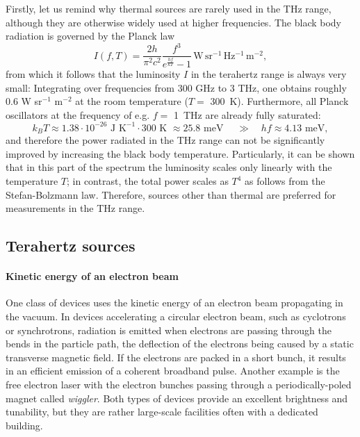 Firstly, let us remind why thermal sources are rarely used in the THz range, although they are otherwise widely used at higher frequencies. The black body radiation is governed by the Planck law \cite[p. 23]{klingshirn2007semiconductor}
\begin{equation}I(f, T) = \frac{2 h}{\pi^2 c^2}\frac{f^3}{e^{\frac{h f}{kT}}-1} \mathrm{\,W\,sr^{-1}\,Hz^{-1}\,m^{-2}}, \label{eq_planck}\end{equation}
from which it follows that the luminosity $I$ in the terahertz range is always very small: Integrating over frequencies from 300 GHz to 3 THz, one obtains roughly 0.6 W sr$^{-1}$ m$^{-2}$ at the room temperature ($T=$ 300~K).  Furthermore, all Planck oscillators at the frequency of e.g. $f =$ 1~THz are already fully saturated:
$$k_B T \approx 1.38\cdot 10^{-26} \text{ J K}^{-1} \cdot 300 \text{ K~} \approx 25.8 \text{ meV } \quad\gg\quad h f \approx 4.13 \text{ meV}, $$
and therefore the power radiated in the THz range can not be significantly improved by increasing the black body temperature. Particularly, it can be shown that in this part of the spectrum the luminosity scales only linearly with the temperature $T$; in contrast, the total power scales as $T^{4}$ as follows from the Stefan-Bolzmann law. Therefore, sources other than thermal are preferred for measurements in the THz range.

\subsection{Terahertz sources}
\paragraph{Kinetic energy of an electron beam} %
One class of devices uses the kinetic energy of an electron beam propagating in the vacuum. In devices accelerating a circular electron beam, such as cyclotrons or synchrotrons, radiation is emitted when electrons are passing through the bends in the particle path, the deflection of the electrons being caused by a static transverse magnetic field. If the electrons are packed in a short bunch, it results in an efficient emission of a coherent broadband pulse. %
Another example is the free electron laser with the electron bunches %
passing through a periodically-poled magnet called \textit{wiggler}. 
Both types of devices provide an excellent brightness and tunability, but they are rather large-scale facilities often with a dedicated building. 

